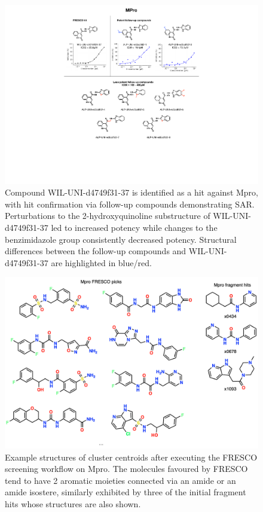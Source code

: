 \begin{figure}[h!]
    \centering
    \includegraphics[width=\linewidth]{Chapters/Fresco/Figs/mpro_hit_IC50.pdf}
    \caption{Compound WIL-UNI-d4749f31-37 is identified as a hit against Mpro, with hit confirmation via follow-up compounds demonstrating SAR. Perturbations to the 2-hydroxyquinoline substructure of WIL-UNI-d4749f31-37 led to increased potency while changes to the benzimidazole group consistently decreased potency. Structural differences between the follow-up compounds and WIL-UNI-d4749f31-37 are highlighted in blue/red.}
    \label{fig:mpro_hit}
\end{figure}
\begin{figure}
    \centering
    \includegraphics[width=0.75\linewidth]{Chapters/Fresco/Figs/mpro_ligands.png}
    \caption{Example structures of cluster centroids after executing the FRESCO screening workflow on Mpro. The molecules favoured by FRESCO tend to have 2 aromatic moieties connected via an amide or an amide isostere, similarly exhibited by three of the initial fragment hits whose structures are also shown.}
    \label{fig:mpro_ligands}
\end{figure}


